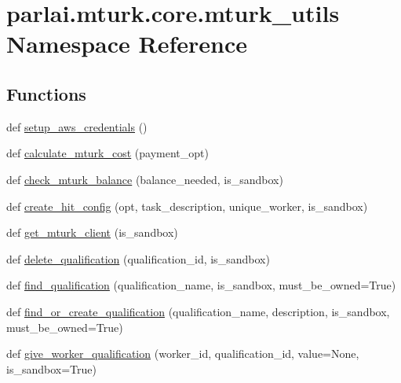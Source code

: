 \hypertarget{namespaceparlai_1_1mturk_1_1core_1_1mturk__utils}{}\section{parlai.\+mturk.\+core.\+mturk\+\_\+utils Namespace Reference}
\label{namespaceparlai_1_1mturk_1_1core_1_1mturk__utils}
\subsection*{Functions}
\begin{DoxyCompactItemize}
\item 
def \hyperlink{namespaceparlai_1_1mturk_1_1core_1_1mturk__utils_a018a49fdf2cf6ff4c0b279d2f5b1bff0}{setup\+\_\+aws\+\_\+credentials} ()
\item 
def \hyperlink{namespaceparlai_1_1mturk_1_1core_1_1mturk__utils_a4add40f6a463a3feb100a3c960ba3405}{calculate\+\_\+mturk\+\_\+cost} (payment\+\_\+opt)
\item 
def \hyperlink{namespaceparlai_1_1mturk_1_1core_1_1mturk__utils_a68fb1962cbfa751d20f701da94ada62b}{check\+\_\+mturk\+\_\+balance} (balance\+\_\+needed, is\+\_\+sandbox)
\item 
def \hyperlink{namespaceparlai_1_1mturk_1_1core_1_1mturk__utils_a3f54e0bc76066fc3a784d6b2e3fc13bb}{create\+\_\+hit\+\_\+config} (opt, task\+\_\+description, unique\+\_\+worker, is\+\_\+sandbox)
\item 
def \hyperlink{namespaceparlai_1_1mturk_1_1core_1_1mturk__utils_a577e2527c04682284394b0951a090695}{get\+\_\+mturk\+\_\+client} (is\+\_\+sandbox)
\item 
def \hyperlink{namespaceparlai_1_1mturk_1_1core_1_1mturk__utils_a389ca1d743e6319cb35916a6b0d7867d}{delete\+\_\+qualification} (qualification\+\_\+id, is\+\_\+sandbox)
\item 
def \hyperlink{namespaceparlai_1_1mturk_1_1core_1_1mturk__utils_a54121023abc81124ba03cc50d5f23af3}{find\+\_\+qualification} (qualification\+\_\+name, is\+\_\+sandbox, must\+\_\+be\+\_\+owned=True)
\item 
def \hyperlink{namespaceparlai_1_1mturk_1_1core_1_1mturk__utils_ae5d70edec5817ee9e05b9675320859d7}{find\+\_\+or\+\_\+create\+\_\+qualification} (qualification\+\_\+name, description, is\+\_\+sandbox, must\+\_\+be\+\_\+owned=True)
\item 
def \hyperlink{namespaceparlai_1_1mturk_1_1core_1_1mturk__utils_a640e2d9d121507f92649cccbd27e3af9}{give\+\_\+worker\+\_\+qualification} (worker\+\_\+id, qualification\+\_\+id, value=None, is\+\_\+sandbox=True)

\end{DoxyCompactItemize}
